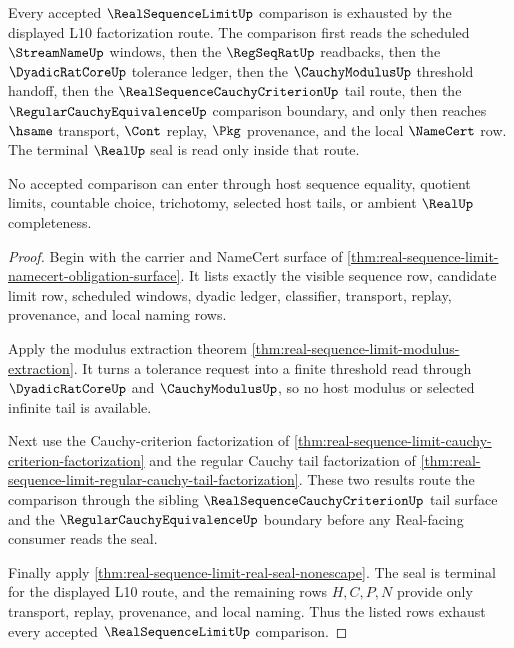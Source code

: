 \begin{theorem}
\label{thm:real-sequence-limit-factorization-completeness}
Every accepted $\RealSequenceLimitUp$ comparison is exhausted by the displayed L10 factorization route. The comparison first reads the scheduled $\StreamNameUp$ windows, then the $\RegSeqRatUp$ readbacks, then the $\DyadicRatCoreUp$ tolerance ledger, then the $\CauchyModulusUp$ threshold handoff, then the $\RealSequenceCauchyCriterionUp$ tail route, then the $\RegularCauchyEquivalenceUp$ comparison boundary, and only then reaches $\hsame$ transport, $\Cont$ replay, $\Pkg$ provenance, and the local $\NameCert$ row. The terminal $\RealUp$ seal is read only inside that route.

No accepted comparison can enter through host sequence equality, quotient limits, countable choice, trichotomy, selected host tails, or ambient $\RealUp$ completeness.
\end{theorem}
\begin{proof}
Begin with the carrier and NameCert surface of \autoref{thm:real-sequence-limit-namecert-obligation-surface}. It lists exactly the visible sequence row, candidate limit row, scheduled windows, dyadic ledger, classifier, transport, replay, provenance, and local naming rows.

Apply the modulus extraction theorem \autoref{thm:real-sequence-limit-modulus-extraction}. It turns a tolerance request into a finite threshold read through $\DyadicRatCoreUp$ and $\CauchyModulusUp$, so no host modulus or selected infinite tail is available.

Next use the Cauchy-criterion factorization of \autoref{thm:real-sequence-limit-cauchy-criterion-factorization} and the regular Cauchy tail factorization of \autoref{thm:real-sequence-limit-regular-cauchy-tail-factorization}. These two results route the comparison through the sibling $\RealSequenceCauchyCriterionUp$ tail surface and the $\RegularCauchyEquivalenceUp$ boundary before any Real-facing consumer reads the seal.

Finally apply \autoref{thm:real-sequence-limit-real-seal-nonescape}. The seal is terminal for the displayed L10 route, and the remaining rows $H,C,P,N$ provide only transport, replay, provenance, and local naming. Thus the listed rows exhaust every accepted $\RealSequenceLimitUp$ comparison.
\end{proof}


